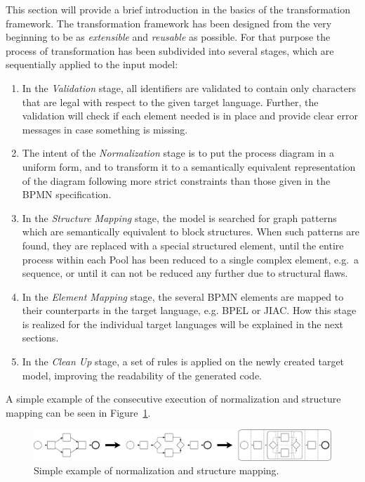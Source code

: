 This section will provide a brief introduction in the basics of the transformation
framework.  The transformation framework has been designed from the very beginning
to be as \emph{extensible} and \emph{reusable} as possible.  For that purpose the
process of transformation has been subdivided into several stages, which are
sequentially applied to the input model:
\begin{enumerate}
	\item In the \emph{Validation} stage, all identifiers are validated to contain
	only characters that are legal with respect to the given target language.
	Further, the validation will check if each element needed is in place and
	provide clear error messages in case something is missing.

	\item The intent of the \emph{Normalization} stage is to put the process
	diagram in a uniform form, and to transform it to a semantically equivalent
	representation of the diagram following more strict constraints than those
	given in the BPMN specification.

	\item In the \emph{Structure Mapping} stage, the model is searched for graph
	patterns which are semantically equivalent to block structures.  When such
	patterns are found, they are replaced with a special structured element, until
	the entire process within each Pool has been reduced to a single complex
	element, e.g.\ a sequence, or until it can not be reduced any further due to
	structural flaws.

	\item In the \emph{Element Mapping} stage, the several BPMN elements are
	mapped to their counterparts in the target language, e.g. BPEL or JIAC. How
	this stage is realized for the individual target languages will be explained
	in the next sections.

	\item In the \emph{Clean Up} stage, a set of rules is applied on the newly
	created target model, improving the readability of the generated code.
\end{enumerate}

A simple example of the consecutive execution of normalization and structure
mapping can be seen in Figure~\ref{fig:norm_struc}.

\begin{figure}[ht]
	\centering
	\includegraphics[width=\textwidth]{figures/trafo/norm_struc.pdf}
	\caption{Simple example of normalization and structure mapping.}
	\label{fig:norm_struc}
\end{figure}


